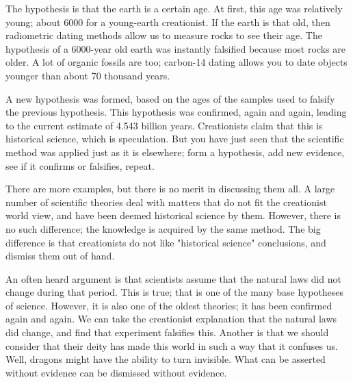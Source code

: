 \begin{multicols}{2}
The hypothesis is that the earth is a certain age. At first, this age was relatively young; about 6000 for a young-earth creationist. If the earth
is that old, then radiometric dating methods allow us to measure rocks to see their age. The hypothesis of a 6000-year old earth was instantly falsified
because most rocks are older. A lot of organic fossils are too; carbon-14 dating allows you to date objects younger than about 70 thousand years.


A new hypothesis was formed, based on the ages of the samples used to falsify the previous hypothesis. This hypothesis was confirmed, again and again,
leading to the current estimate of 4.543 billion years. Creationists claim that this is historical science, which is speculation. But you have just seen
that the scientific method was applied just as it is elsewhere; form a hypothesis, add new evidence, see if it confirms or falsifies, repeat. 


There are more examples, but there is no merit in discussing them all. A large number of scientific theories deal with matters that do not fit the
creationist world view, and have been deemed historical science by them. However, there is no such difference; the knowledge is acquired by the same
method. The big difference is that creationists do not like "historical science" conclusions, and dismiss them out of hand.


An often heard argument is that scientists assume that the natural laws did not change during that period. This is true; that is one of the many base
hypotheses of science. However, it is also one of the oldest theories; it has been confirmed again and again. We can take the creationist explanation
that the natural laws did change, and find that experiment falsifies this. Another is that we should consider that their deity has made this world in
such a way that it confuses us. Well, dragons might have the ability to turn invisible. What can be asserted without evidence can be dismissed without
evidence. 
\end{multicols}